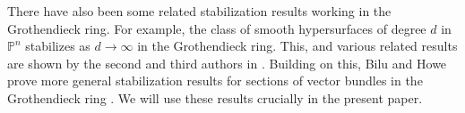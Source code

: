\documentclass[12 pt]{amsart}
\theoremstyle{plain}
\theoremstyle{definition}
\theoremstyle{remark}
\numberwithin{equation}{section}
\newcommand\bp{\mathbb P}
\begin{document}
%
%
%

There have also been some related stabilization results working in the
Grothendieck ring.
For example, the class of smooth hypersurfaces of degree $d$ in $\bp^n$
stabilizes as $d \to \infty$
in the Grothendieck ring.
This, and various related results are shown by the second and third authors in \cite{Vakil2015}.
Building on this, Bilu and Howe
prove more general stabilization results for sections of vector bundles in the
Grothendieck ring
\cite[Thm.\ A]{biluH:motivic-euler-products-in-motivic-statistics}.
We will use these results crucially in the present paper.
\end{document}
